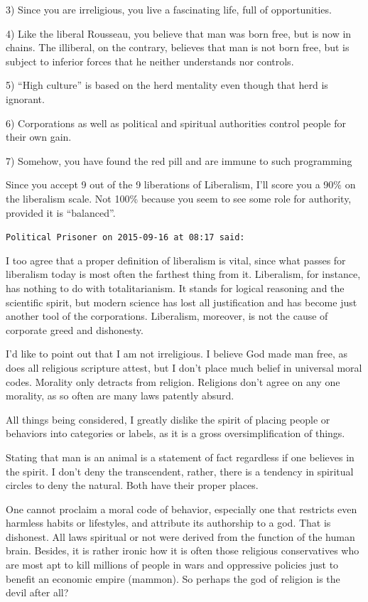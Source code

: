 \begin{footnotesize}
\begin{sffamily}
3) Since you are irreligious, you live a fascinating life, full of opportunities.

4) Like the liberal Rousseau, you believe that man was born free, but is now in chains. The illiberal, on the contrary, believes that man is not born free, but is subject to inferior forces that he neither understands nor controls.

5) ``High culture'' is based on the herd mentality even though that herd is ignorant.

6) Corporations as well as political and spiritual authorities control people for their own gain.

7) Somehow, you have found the red pill and are immune to such programming

Since you accept 9 out of the 9 liberations of Liberalism, I'll score you a 90\% on the liberalism scale. Not 100\% because you seem to see some role for authority, provided it is ``balanced''.

\hfill

\texttt{Political Prisoner on 2015-09-16 at 08:17 said:}

I too agree that a proper definition of liberalism is vital, since what passes for liberalism today is most often the farthest thing from it. Liberalism, for instance, has nothing to do with totalitarianism. It stands for logical reasoning and the scientific spirit, but modern science has lost all justification and has become just another tool of the corporations. Liberalism, moreover, is not the cause of corporate greed and dishonesty.

I'd like to point out that I am not irreligious. I believe God made man free, as does all religious scripture attest, but I don't place much belief in universal moral codes. Morality only detracts from religion. Religions don't agree on any one morality, as so often are many laws patently absurd.

All things being considered, I greatly dislike the spirit of placing people or behaviors into categories or labels, as it is a gross oversimplification of things.

Stating that man is an animal is a statement of fact regardless if one believes in the spirit. I don't deny the transcendent, rather, there is a tendency in spiritual circles to deny the natural. Both have their proper places.

One cannot proclaim a moral code of behavior, especially one that restricts even harmless habits or lifestyles, and attribute its authorship to a god. That is dishonest. All laws spiritual or not were derived from the function of the human brain. Besides, it is rather ironic how it is often those religious conservatives who are most apt to kill millions of people in wars and oppressive policies just to benefit an economic empire (mammon). So perhaps the god of religion is the devil after all?


\end{sffamily}
\end{footnotesize}
